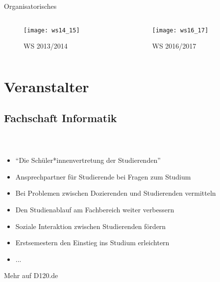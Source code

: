 

\usepackage{listings}
\usepackage{tikz}



\begin{titleframe}
	\begin{center}
		{\huge Organisatorisches}
	\end{center}
	\vspace{-5mm}
	\begin{columns}
		\begin{column}{6cm}
			\begin{figure}
				\centering
				\texttt{[image: ws14\_15]}
				\caption{WS 2013/2014}
			\end{figure}
		\end{column}
		\begin{column}{6cm}
			\begin{figure}
				\centering
				\texttt{[image: ws16\_17]}
				\caption{WS 2016/2017}
			\end{figure}
		\end{column}
	\end{columns}

\end{titleframe}



\section{Veranstalter}
\subsection*{Fachschaft Informatik}
\begin{frame}
	\frametitle{\insertsectionhead \\ {\small \insertsubsectionhead}}
	\begin{itemize}
		\item "`Die Schüler*innenvertretung der Studierenden"'
		\item Ansprechpartner für Studierende bei Fragen zum Studium
		\item Bei Problemen zwischen Dozierenden und Studierenden vermitteln
		\item Den Studienablauf am Fachbereich weiter verbessern
		\item Soziale Interaktion zwischen Studierenden fördern
		\item Erstsemestern den Einstieg ins Studium erleichtern
		\item ...
	\end{itemize}
\centering
\vspace{3mm}
\huge Mehr auf D120.de
\end{frame}

